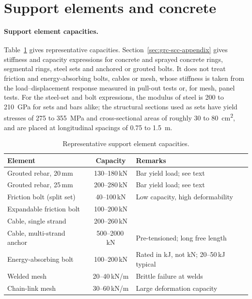 \section{Support elements and concrete}
\label{sec:support-elements-and-concrete}

\paragraph{Support element capacities.}
Table~\ref{tab:support-props} gives representative capacities.
Section~\ref{sec:grc-scc-appendix} gives stiffness and capacity expressions
for concrete and sprayed concrete rings, segmental rings, steel sets and
anchored or grouted bolts. It does not treat friction and energy-absorbing
bolts, cables or mesh, whose stiffness is taken from the load--displacement
response measured in pull-out tests or, for mesh, panel tests. For the
steel-set and bolt expressions, the modulus of steel is 200 to
210~GPa for sets and bars alike; the structural sections used as sets have
yield stresses of 275 to 355~MPa and cross-sectional areas of roughly 30 to
80~cm\textsuperscript{2}, and are placed at longitudinal spacings of 0.75 to
1.5~m.

\begin{table}[htbp]
\caption{Representative support element capacities.}
\label{tab:support-props}
\centering
\small
\begin{tabularx}{\textwidth}{X c X}
\toprule
\textbf{Element} & \textbf{Capacity} & \textbf{Remarks} \\
\midrule
Grouted rebar, 20\,mm       & 130--180\,kN & Bar yield load; see text \\
Grouted rebar, 25\,mm       & 200--280\,kN & Bar yield load; see text \\
Friction bolt (split set)   & 40--100\,kN  & Low capacity, high deformability \\
Expandable friction bolt    & 100--200\,kN & \\
Cable, single strand        & 200--260\,kN & \\
Cable, multi-strand anchor  & 500--2000\,kN & Pre-tensioned; long free length \\
Energy-absorbing bolt       & 100--200\,kN & Rated in kJ, not kN; 20--50\,kJ typical \\
Welded mesh                 & 20--40\,kN/m & Brittle failure at welds \\
Chain-link mesh             & 30--60\,kN/m & Large deformation capacity \\
\bottomrule
\end{tabularx}
\end{table}

